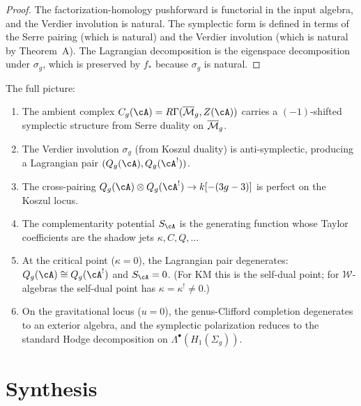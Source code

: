 \begin{proof}
The factorization-homology pushforward is functorial in the
input algebra, and the Verdier involution is natural.
The symplectic form is defined in terms of the Serre pairing
(which is natural) and the Verdier involution (which is
natural by Theorem~A).
The Lagrangian decomposition is the eigenspace decomposition
under $\sigma_g$, which is preserved by $f_*$ because
$\sigma_g$ is natural.
\end{proof}

\begin{remark}
The full picture:
\begin{enumerate}[label=\textup{(\arabic*)}]
\item The ambient complex
 $C_g(\cA) = R\Gamma(\Mbar_g, Z(\cA))$
 carries a $(-1)$-shifted symplectic structure
 from Serre duality on $\overline{\mathcal{M}}_g$.
\item The Verdier involution $\sigma_g$ (from Koszul duality)
 is anti-symplectic, producing a Lagrangian pair
 $(Q_g(\cA), Q_g(\cA^!))$.
\item The cross-pairing
 $Q_g(\cA) \otimes Q_g(\cA^!) \to k[-(3g-3)]$
 is perfect on the Koszul locus.
\item The complementarity potential $S_\cA$ is the generating
 function whose Taylor coefficients are the shadow jets
 $\kappa, C, Q, \dots$
\item At the critical point ($\kappa = 0$), the Lagrangian
 pair degenerates: $Q_g(\cA) \cong Q_g(\cA^!)$ and
 $S_\cA = 0$. (For KM this is the self-dual point;
 for $\mathcal{W}$-algebras the self-dual point has
 $\kappa = \kappa^! \neq 0$.)
\item On the gravitational locus ($u = 0$), the genus-Clifford
 completion degenerates to an exterior algebra, and the
 symplectic polarization reduces to the standard Hodge
 decomposition on $\Lambda^\bullet(H_1(\Sigma_g))$.
\end{enumerate}
\end{remark}

\section{Synthesis}
\label{sec:anom-ext-supplement}

